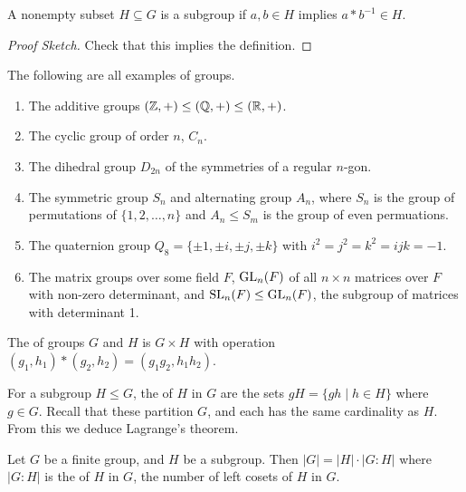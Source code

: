 \documentclass[a4paper]{scrreprt}
\begin{document}
\begin{lemma}
A nonempty subset $H \subseteq G$ is a subgroup if $a, b \in H$ implies $a * b^{-1} \in H$.
\end{lemma}
\begin{proof}[Proof Sketch]
	Check that this implies the definition.
\end{proof}

\begin{example}
	The following are all examples of groups.
	\begin{enumerate}[label=(\roman*)]
		\item The additive groups $(\mathbb{Z}, +) \leq (\mathbb{Q}, +) \leq (\mathbb{R}, +)$.
		\item The cyclic group of order $n$, $C_n$.
		\item The dihedral group $D_{2n}$ of the symmetries of a regular $n$-gon.
		\item The symmetric group $S_n$ and alternating group $A_n$, where $S_n$ is the group of permutations of $\{1, 2, \dots, n\}$ and $A_n \leq S_m$ is the group of even permuations. 
		\item The quaternion group $Q_8 = \{\pm 1, \pm i, \pm j, \pm k \}$ with $i^2 = j^2 = k^2 = ijk = -1$.
		\item The matrix groups over some field $F$, $\operatorname{GL}_n(F)$ of all $n \times n$ matrices over $F$ with non-zero determinant, and $\operatorname{SL}_n(F) \leq \operatorname{GL}_n(F)$, the subgroup of matrices with determinant 1.
	\end{enumerate}
\end{example}

\begin{definition}
	The  of groups $G$ and $H$ is $G \times H$ with operation $(g_1, h_1) * (g_2, h_2) = (g_1 g_2, h_1 h_2)$. 
\end{definition}

For a subgroup $H \leq G$, the  of $H$ in $G$ are the sets $gH = \{gh \mid h \in H \}$ where $g \in G$. Recall that these partition $G$, and each has the same cardinality as $H$. From this we deduce Lagrange's theorem.

\begin{theorem}
	Let $G$ be a finite group, and $H$ be a subgroup. Then $|G| = |H| \cdot |G : H|$ where $|G : H|$ is the  of $H$ in $G$, the number of left cosets of $H$ in $G$.
\end{theorem}
\end{document}
